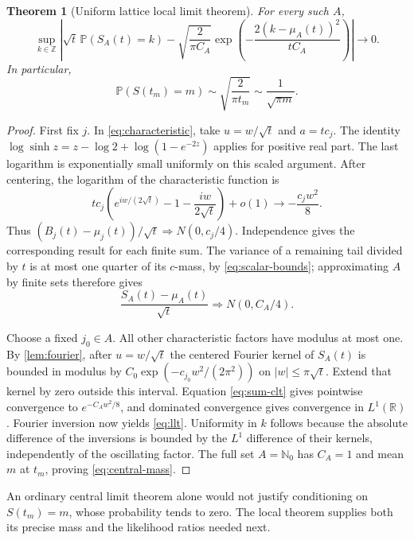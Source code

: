 \documentclass[11pt,a4paper]{article}
\numberwithin{equation}{section}
\newtheorem{theorem}{Theorem}[section]
\theoremstyle{definition}
\theoremstyle{remark}
\newcommand{\PP}{\mathbb P}
\newcommand{\R}{\mathbb R}
\newcommand{\N}{\mathbb N}
\newcommand{\Z}{\mathbb Z}
\begin{document}
\begin{theorem}[Uniform lattice local limit theorem]
\label{thm:llt}
For every such $A$,
\begin{equation}
\sup_{k\in\Z}\left|
\sqrt t\,\PP(S_A(t)=k)
-\sqrt{\frac2{\pi C_A}}
 \exp\left(-\frac{2(k-\mu_A(t))^2}{tC_A}\right)
\right|\longrightarrow0.
\label{eq:llt}
\end{equation}
In particular,
\begin{equation}
\PP(S(t_m)=m)\sim\sqrt{\frac2{\pi t_m}}
\sim\frac1{\sqrt{\pi m}}.
\label{eq:central-mass}
\end{equation}
\end{theorem}
\begin{proof}
First fix $j$. In \cref{eq:characteristic}, take $u=w/\sqrt t$ and
$a=tc_j$. The identity
$\log\sinh z=z-\log2+\log(1-e^{-2z})$ applies for positive real part.
The last logarithm is exponentially small uniformly on this scaled
argument. After centering, the logarithm of the characteristic function is
\[
tc_j\left(e^{iw/(2\sqrt t)}-1-\frac{iw}{2\sqrt t}\right)+o(1)
\longrightarrow-\frac{c_jw^2}{8}.
\]
Thus $(B_j(t)-\mu_j(t))/\sqrt t\Rightarrow N(0,c_j/4)$.
Independence gives the corresponding result for each finite sum. The
variance of a remaining tail divided by $t$ is at most one quarter of its
$c$-mass, by \cref{eq:scalar-bounds}; approximating $A$ by finite sets
therefore gives
\begin{equation}
\frac{S_A(t)-\mu_A(t)}{\sqrt t}\Rightarrow N(0,C_A/4).
\label{eq:sum-clt}
\end{equation}

Choose a fixed $j_0\in A$. All other characteristic factors have modulus
at most one. By \cref{lem:fourier}, after $u=w/\sqrt t$ the centered
Fourier kernel of $S_A(t)$ is bounded in modulus by
$C_0\exp(-c_{j_0}w^2/(2\pi^2))$ on $|w|\le\pi\sqrt t$.
Extend that kernel by zero outside this interval. Equation
\cref{eq:sum-clt} gives pointwise convergence to $e^{-C_Aw^2/8}$,
and dominated convergence gives convergence in $L^1(\R)$.
Fourier inversion now yields \cref{eq:llt}. Uniformity in $k$ follows
because the absolute difference of the inversions is bounded by the
$L^1$ difference of their kernels, independently of the oscillating factor.
The full set $A=\N_0$ has $C_A=1$ and mean $m$ at $t_m$, proving
\cref{eq:central-mass}.
\end{proof}

An ordinary central limit theorem alone would not justify conditioning on
$S(t_m)=m$, whose probability tends to zero. The local theorem supplies
both its precise mass and the likelihood ratios needed next.
\end{document}
